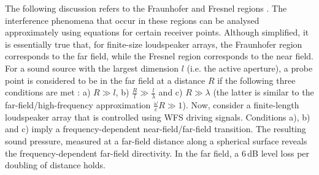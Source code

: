 The following discussion refers to the Fraunhofer and Fresnel regions
\cite[Ch.~26]{Skudrzyk1971}.
The interference phenomena that occur in these regions can be analysed
approximately using equations for certain receiver points.
%
Although simplified, it is essentially true that, for finite-size
loudspeaker arrays,
the Fraunhofer region corresponds to the far field,
while the Fresnel region corresponds to the near field.
%
For a sound source with the largest dimension $l$ (i.e. the active aperture),
a probe point is considered to be in the far field at a distance $R$ if the
following three conditions are met \cite[Ch.~3.5.4]{Moeser2009_book}:
a) $R \gg l$,
b) $\frac{R}{l} \gg \frac{l}{\lambda}$ and
c) $R \gg \lambda$ (the latter is similar to the far-field/high-frequency
approximation $\frac{\omega}{c} R \gg 1$).
%
Now, consider a finite-length loudspeaker array that is controlled using
WFS driving signals.
Conditions a), b) and c) imply a frequency-dependent near-field/far-field
transition.
The resulting sound pressure, measured at a far-field distance along a
spherical surface reveals the frequency-dependent
far-field directivity.
In the far field, a $6$\,dB level loss per doubling of distance holds.



